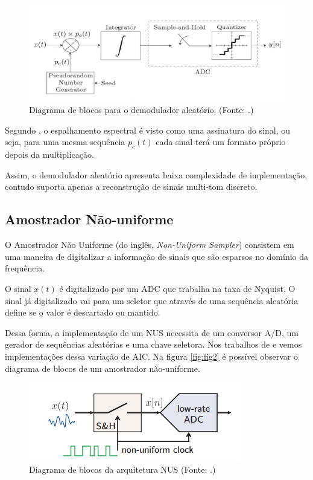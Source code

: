 \documentclass[a4paper, 12pt]{article}
\begin{document}
\begin{figure}[h!]
    \centering
    \includegraphics[scale=0.85]{fig1.PNG}
    \caption{Diagrama de blocos para o demodulador aleatório. (Fonte:  \cite{dutta2015analog}.)}
    \label{fig:fig1}
\end{figure}{}

Segundo \cite{tropp2009beyond}, o espalhamento espectral é visto como uma assinatura do sinal, ou seja, para uma mesma sequência $p_c(t)$ cada sinal terá um formato próprio depois da multiplicação\cite{Vanderson2017}. 

Assim, o demodulador aleatório apresenta baixa complexidade de implementação, contudo suporta apenas a reconstrução de sinais multi-tom discreto. 

\subsection{Amostrador Não-uniforme}

O Amostrador Não Uniforme (do inglês, \textit{Non-Uniform Sampler}) consistem em uma maneira de digitalizar a informação de sinais que são esparsos no domínio da frequência. 

O sinal $x(t)$ é digitalizado por um ADC que trabalha na taxa de Nyquist. O sinal já digitalizado vai para um seletor que através de uma sequência
aleatória define se o valor é descartado ou mantido.

Dessa forma, a implementação de um NUS necessita de um conversor A/D, um
gerador de sequências aleatórias e uma chave seletora. Nos trabalhos de \cite{bellasi2013vlsi} e \cite{pelissier2017non} vemos implementações dessa variação de AIC. Na figura \ref{fig:fig2} é possível observar o diagrama de blocos de um amostrador não-uniforme.

\begin{figure}[h!]
    \centering
    \includegraphics{fig2.PNG}
    \caption{Diagrama de blocos da arquitetura NUS (Fonte: \cite{pelissier2017non}.)}
    \label{fig:my_label}
\end{figure}{}
\end{document}
